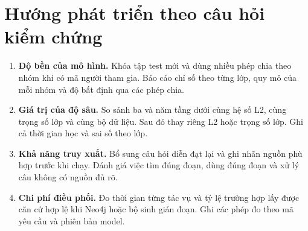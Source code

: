 \section{Hướng phát triển theo câu hỏi kiểm chứng}
\begin{enumerate}
\item \textbf{Độ bền của mô hình.} Khóa tập test mới và dùng nhiều phép chia theo nhóm khi có mã người tham gia. Báo cáo chỉ số theo từng lớp, quy mô của mỗi nhóm và độ bất định qua các phép chia.
\item \textbf{Giá trị của độ sâu.} So sánh ba và năm tầng dưới cùng hệ số L2, cùng trọng số lớp và cùng bộ dữ liệu. Sau đó thay riêng L2 hoặc trọng số lớp. Ghi cả thời gian học và sai số theo lớp.
\item \textbf{Khả năng truy xuất.} Bổ sung câu hỏi diễn đạt lại và ghi nhãn nguồn phù hợp trước khi chạy. Đánh giá việc tìm đúng đoạn, dùng đúng đoạn và xử lý câu không có nguồn đủ rõ.
\item \textbf{Chi phí điều phối.} Đo thời gian từng tác vụ và tỷ lệ trường hợp lấy được căn cứ hợp lệ khi Neo4j hoặc bộ sinh gián đoạn. Ghi các phép đo theo mã yêu cầu và phiên bản model.
\end{enumerate}
